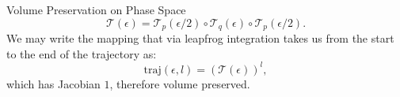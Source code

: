 \documentclass{beamer}
\begin{document}
\begin{frame}[t,allowframebreaks]{Volume Preservation on Phase Space}
            \begin{equation*}
                \label{eq:lfcomp1}
                \mathcal{T}\left(\epsilon\right)=\mathcal{T}_p\left(\epsilon/2\right)\circ \mathcal{T}_q\left(\epsilon\right)\circ \mathcal{T}_p\left(\epsilon/2\right).
            \end{equation*}
            We may write the mapping that via leapfrog integration takes us from the start to the end of the trajectory as:
            \begin{equation*}
                \text{traj}\left(\epsilon,l\right) = \left(\mathcal{T}\left(\epsilon\right)\right)^l,
            \end{equation*}
            which has Jacobian $1$, therefore volume preserved.


\end{frame}
\end{document}
